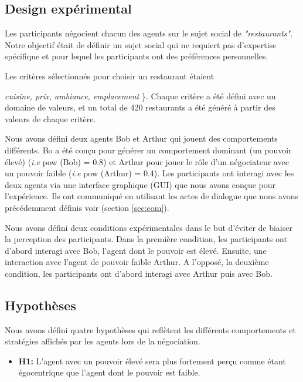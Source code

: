 \documentclass [french]{sig-alternate-05-2015}
\begin{document}
			\subsection{Design expérimental}
			
			Les participants négocient chacun des agents sur le sujet social de \emph {"restaurants"}. Notre objectif était de définir un sujet social qui ne requiert pas d'expertise spécifique et pour lequel les participants ont des préférences personnelles.
			
			Les critères sélectionnés pour choisir un restaurant étaient \ {\textit {cuisine, prix, ambiance, emplacement} \}. Chaque critère a été défini avec un domaine de valeurs, et un total de 420 restaurants a été généré à partir des valeurs de chaque critère.
				
			Nous avons défini deux agents Bob et Arthur qui jouent des comportements différents. Bo a été conçu pour générer un comportement dominant (un pouvoir élevé) (\textit {i.e} pow (Bob) = 0.8) et Arthur pour jouer le rôle d'un négociateur avec un pouvoir faible (\textit {i.e} pow (Arthur) = 0.4).
			Les participants ont interagi avec les deux agents via une interface graphique (GUI) que nous avons conçue pour l'expérience. Ils ont communiqué en utilisant les actes de dialogue que nous avons précédemment définis voir (section \ref {sec:com}).
						
			Nous avons défini deux conditions expérimentales dans le but d'éviter de biaiser la perception des participants. Dans la première condition, les participants ont d'abord interagi avec Bob, l'agent dont le pouvoir est élevé. Ensuite, une interaction avec l'agent de pouvoir faible Arthur.
			A l'opposé, la deuxième condition, les participants ont d'abord interagi  avec Arthur puis avec Bob.
			
			\subsection {Hypothèses}
			Nous avons défini quatre hypothèses qui reflètent les différents comportements et stratégies affichés par les agents lors de la négociation.
			
			\begin{itemize}
				\item \textbf {H1:} L'agent avec un pouvoir élevé sera plus fortement perçu comme étant égocentrique que l'agent dont le pouvoir est faible.
				

\end{itemize}}
\end{document}
